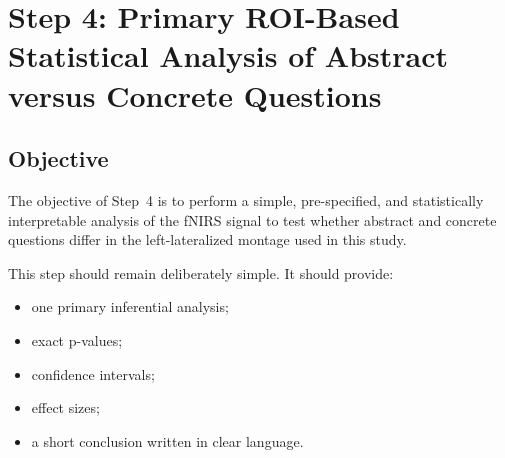 \documentclass[11pt]{article}
\begin{document}
\sloppy
\section{Step 4: Primary ROI-Based Statistical Analysis of Abstract versus Concrete Questions}
\label{sec:step4_fnirs_analysis}

\subsection{Objective}
The objective of Step~4 is to perform a simple, pre-specified, and statistically interpretable
analysis of the fNIRS signal to test whether abstract and concrete questions differ in the
left-lateralized montage used in this study.

This step should remain deliberately simple.
It should provide:
\begin{itemize}
    \item one primary inferential analysis;
    \item exact p-values;
    \item confidence intervals;
    \item effect sizes;
    \item a short conclusion written in clear language.
\end{itemize}
\end{document}
